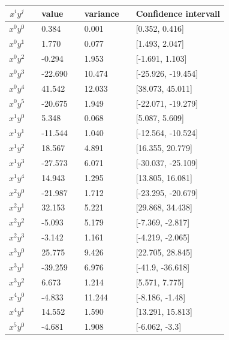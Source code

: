   \begin{center}
 \label{tab:Confidenceintervall_Ridge}
 \begin{tabularx}{\textwidth}{c X l X l X l }
     \hline
     \hline
     $x^iy^j$ && value && variance && Confidence intervall \\
     \hline
$x^0y^0$     && 0.384    && 0.001   && [0.352, 0.416]     \\
$x^0y^1$     && 1.770    && 0.077   && [1.493, 2.047]     \\
$x^0y^2$     && -0.294   && 1.953   && [-1.691, 1.103]    \\
$x^0y^3$     && -22.690  && 10.474  && [-25.926, -19.454] \\
$x^0y^4$     && 41.542   && 12.033  && [38.073, 45.011]   \\
$x^0y^5$     && -20.675  && 1.949   && [-22.071, -19.279] \\
$x^1y^0$     && 5.348    && 0.068   && [5.087, 5.609]     \\
$x^1y^1$     && -11.544  && 1.040   && [-12.564, -10.524] \\
$x^1y^2$     && 18.567   && 4.891   && [16.355, 20.779]   \\
$x^1y^3$     && -27.573  && 6.071   && [-30.037, -25.109] \\
$x^1y^4$     && 14.943   && 1.295   && [13.805, 16.081]   \\
$x^2y^0$     && -21.987  && 1.712   && [-23.295, -20.679] \\
$x^2y^1$     && 32.153   && 5.221   && [29.868, 34.438]   \\
$x^2y^2$     && -5.093   && 5.179   && [-7.369, -2.817]   \\
$x^2y^3$     && -3.142   && 1.161   && [-4.219, -2.065]   \\
$x^3y^0$     && 25.775   && 9.426   && [22.705, 28.845]   \\
$x^3y^1$     && -39.259  && 6.976   && [-41.9, -36.618]   \\
$x^3y^2$     && 6.673    && 1.214   && [5.571, 7.775]     \\
$x^4y^0$     && -4.833   && 11.244  && [-8.186, -1.48]    \\
$x^4y^1$     && 14.552   && 1.590   && [13.291, 15.813]   \\
$x^5y^0$     && -4.681   && 1.908   && [-6.062, -3.3]    \\ 
    \hline
 \end{tabularx}
 \end{center}      

